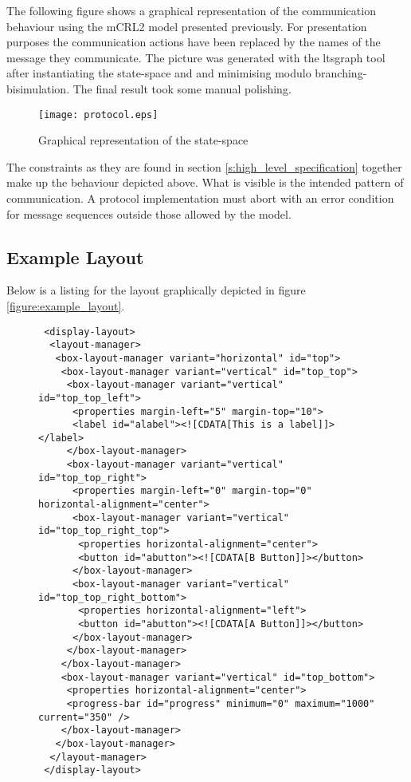 \documentclass{article}
\begin{document}
   The following figure shows a graphical representation of the communication
   behaviour using the mCRL2 model presented previously. For presentation
   purposes the communication actions have been replaced by the names of the
   message they communicate.  The picture was generated with the ltsgraph tool
   after instantiating the state-space and and minimising modulo
   branching-bisimulation. The final result took some manual polishing.

  \begin{figure}[H]
   \texttt{[image: protocol.eps]}
   \caption{Graphical representation of the state-space}
  \end{figure}

   \noindent The constraints as they are found in section
   \ref{s:high_level_specification} together make up the behaviour depicted
   above. What is visible is the intended pattern of communication. A protocol
   implementation must abort with an error condition for message sequences
   outside those allowed by the model.

  \pagebreak

  \subsection{Example Layout} \label{figure:example_layout_listing}
  Below is a listing for the layout graphically depicted in figure
  \ref{figure:example_layout}.

  \begin{figure}[H]
   \small \begin{verbatim}
 <display-layout>
  <layout-manager>
   <box-layout-manager variant="horizontal" id="top">
    <box-layout-manager variant="vertical" id="top_top">
     <box-layout-manager variant="vertical" id="top_top_left">
      <properties margin-left="5" margin-top="10">
      <label id="alabel"><![CDATA[This is a label]]></label>
     </box-layout-manager>
     <box-layout-manager variant="vertical" id="top_top_right">
      <properties margin-left="0" margin-top="0" horizontal-alignment="center">
      <box-layout-manager variant="vertical" id="top_top_right_top">
       <properties horizontal-alignment="center">
       <button id="abutton"><![CDATA[B Button]]></button>
      </box-layout-manager>
      <box-layout-manager variant="vertical" id="top_top_right_bottom">
       <properties horizontal-alignment="left">
       <button id="abutton"><![CDATA[A Button]]></button>
      </box-layout-manager>
     </box-layout-manager>
    </box-layout-manager>
    <box-layout-manager variant="vertical" id="top_bottom">
     <properties horizontal-alignment="center">
     <progress-bar id="progress" minimum="0" maximum="1000" current="350" />
    </box-layout-manager>
   </box-layout-manager>
  </layout-manager>
 </display-layout>\end{verbatim}
  \normalsize
  \end{figure}
\end{document}

